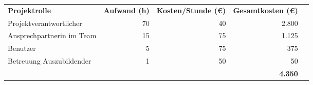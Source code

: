 \begin{tabularx}{\textwidth}{lrrrr}
    \rowcolor{KVGruen}\textbf{Projektrolle} & \textbf{Aufwand (h)} & \textbf{Kosten/Stunde (€)} & \textbf{Gesamtkosten (€)} \\
    Projektverantwortlicher & 70 & 40 & 2.800 \\
    \rowcolor{KVGrau}Ansprechpartnerin im Team & 15 & 75 & 1.125 \\
    Benutzer & 5 & 75 & 375 \\
    \rowcolor{KVGrau}Betreuung Auszubildender & 1 & 50 & 50 \\
    \hline
    \hline
    \rowcolor{KVGruen}\textbf{} & \textbf{} & \textbf{} & \textbf{4.350} \\
\end{tabularx}
    